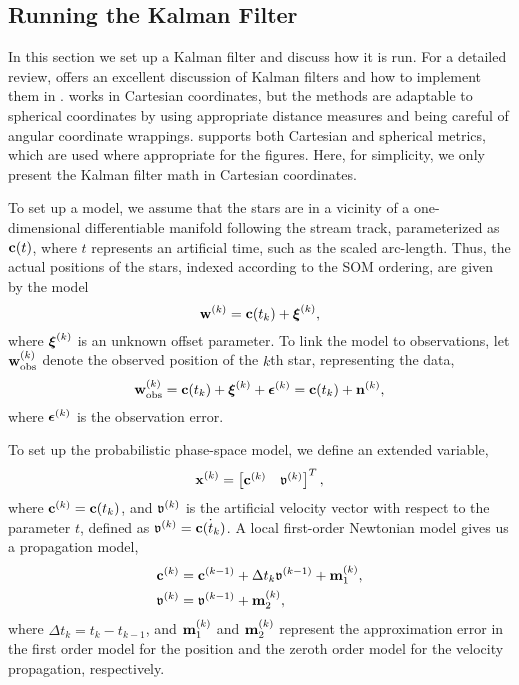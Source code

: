 \documentclass[fleqn,usenatbib]{mnras}
\begin{document}
  \subsection{Running the Kalman Filter} \label{sub:filter_setup}

    In this section we set up a Kalman filter and discuss how it is run. For a
    detailed review, \citet{KalmanFiltersinPython} offers an excellent
    discussion of Kalman filters and how to implement them in \python.
    \citet{KalmanFiltersinPython} works in Cartesian coordinates, but the
    methods are adaptable to spherical coordinates by using appropriate distance
    measures and being careful of angular coordinate wrappings. \trackstream{}
    supports both Cartesian and spherical metrics, which are used where
    appropriate for the figures. Here, for simplicity, we only present the
    Kalman filter math in Cartesian coordinates.

    To set up a model, we assume that the stars are in a vicinity of a
    one-dimensional differentiable manifold following the stream track,
    parameterized as $\mathbf{c}(t)$, where $t$ represents an artificial time, such
    as the scaled arc-length. Thus, the actual positions of the stars, indexed
    according to the SOM ordering, are given by the model
    \begin{equation}
        \mathbf{w}^{(k)} = \mathbf{c}(t_k) + \mbox{\boldmath$\xi$}^{(k)},
    \end{equation}
    where $\mbox{\boldmath$\xi$}^{(k)}$ is an unknown offset parameter. To link the model
    to observations, let $\mathbf{w}^{(k)}_{\rm obs}$ denote the observed position
    of the $k$th star, representing the data,
    \begin{equation}\label{eq:observation}
        \mathbf{w}^{(k)}_{\rm obs}
        = \mathbf{c}(t_k) + \mbox{\boldmath$\xi$}^{(k)} + \mbox{\boldmath$\epsilon$}^{(k)}
        = \mathbf{c}(t_k) + \mathbf{n}^{(k)},
    \end{equation}
    where $\mbox{\boldmath$\epsilon$}^{(k)}$ is the observation error. 

    To set up the probabilistic phase-space model, we define an extended
    variable,
    \begin{equation}
        \mathbf{x}^{(k)} = \begin{bmatrix} \mathbf{c}^{(k)} & \mathfrak{v}^{(k)} \end{bmatrix}^T,
    \end{equation}
    where $\mathbf{c}^{(k)} = \mathbf{c}(t_k)$, and $\mathfrak{v}^{(k)}$ is the
    artificial velocity vector with respect to the parameter $t$, defined as
    $\mathfrak{v}^{(k)} = \dot{\mathbf{c}(t_k)}$. A local first-order Newtonian model
    gives us a propagation model,
    \begin{align}\label{eq:propagation}
        \mathbf{c}^{(k)} &= \mathbf{c}^{(k-1)} + \Delta t_{k} \mathfrak{v}^{(k-1)} + \mathbf{m}^{(k)}_1,
        \\
        \mathfrak{v}^{(k)} &= \mathfrak{v}^{(k-1)} + \mathbf{m}^{(k)}_2, \nonumber
    \end{align}
    where $\Delta t_{k} = t_{k} -t_{k-1} $, and  $\mathbf{m}^{(k)}_1$ and
    $\mathbf{m}_2^{(k)}$ represent the approximation error in the first order model
    for the position and the zeroth order model for the velocity propagation,
    respectively.
 
\end{document}
